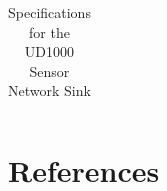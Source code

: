 \documentclass[a4paper]{article}
\begin{document}
\begin{table}[H]
\begin{tabular}{| l | l | l |}
	\end{tabular}
	\caption{Specifications for the UD1000 Sensor Network Sink \cite{UD1000}}
	\label{tab:UD1000-spec}
\end{table}

\newpage

\section{References}
\renewcommand{\refname}{\vspace{-1cm}}


\end{document}
